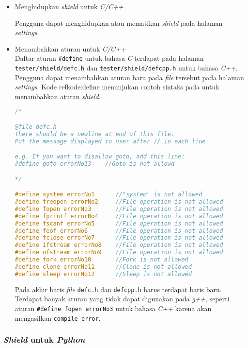 \begin{itemize}
\item Menghidupkan \textit{shield} untuk \textit{C/C++}

Pengguna dapat menghidupkan atau mematikan \textit{shield} pada halaman \textit{settings}.

\item Menambahkan aturan untuk \textit{C/C++}\\
Daftar aturan \verb|#define| untuk bahasa \textit{C} terdapat pada halaman \texttt{tester/shield/defc.h} dan \texttt{tester/shield/defcpp.h} untuk bahasa \textit{C++}. Pengguna dapat menambahkan aturan baru pada \textit{file} tersebut pada halaman \textit{settings}. Kode ref{kode:define} menunjukan contoh sintaks pada untuk menambahkan aturan \textit{shield}.

\begin{lstlisting}[language=C,caption=Sintaks aturan \textit{\#define}, label=kode:define]
/*

@file defc.h
There should be a newline at end of this file.
Put the message displayed to user after // in each line

e.g. If you want to disallow goto, add this line:
#define goto errorNo13    //Goto is not allowd

*/

#define system errorNo1      //"system" is not allowed
#define freopen errorNo2     //File operation is not allowed
#define fopen errorNo3       //File operation is not allowed
#define fprintf errorNo4     //File operation is not allowed
#define fscanf errorNo5      //File operation is not allowed
#define feof errorNo6        //File operation is not allowed
#define fclose errorNo7      //File operation is not allowed
#define ifstream errorNo8    //File operation is not allowed
#define ofstream errorNo9    //File operation is not allowed
#define fork errorNo10       //Fork is not allowed
#define clone errorNo11      //Clone is not allowed
#define sleep errorNo12      //Sleep is not allowed
\end{lstlisting}

Pada akhir baris \textit{file} \verb|defc.h| dan \verb|defcpp.h| harus terdapat baris baru. Terdapat banyak aturan yang tidak dapat digunakan pada \textit{g++}, seperti aturan \verb|#define fopen errorNo3| untuk bahasa \textit{C++} karena akan mengasilkan \texttt{compile error}.

\end{itemize} 
\subsubsection{\textit{Shield} untuk \textit{Python}}

